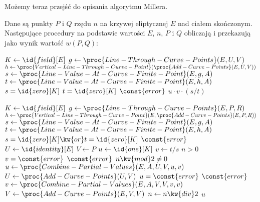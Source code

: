 \noindent
Możemy teraz przejść do opisania algorytmu Millera.

\begin{algorithm}\label{miller_alg}
Dane są punkty $P$ i $Q$ rzędu $n$
na krzywej eliptycznej $E$ nad ciałem skończonym.
Następujące procedury
na podstawie wartości $E$, $n$, $P$ i $Q$
obliczają i przekazują jako wynik
wartość $w(P, Q)$:

\begin{codebox}
\li $K \gets \id{field}[E]$
\li $g \gets \proc{Line-Through-Curve-Points}(E, U, V)$
\li $h \gets \proc{Vertical-Line-Through-Curve-Point}(\proc{Add-Curve-Points}(E, U, V))$
\li $s \gets \proc{Line-Value-At-Curve-Finite-Point}(E, g, A)$
\li $t \gets \proc{Line-Value-At-Curve-Finite-Point}(E, h, A)$
\li \If $s = \id{zero}[K]$  $t = \id{zero}[K]$
\li     \Then \Return $\const{error}$
    \End
\li \Return $u \cdot v \cdot (s / t)$
\end{codebox}

\begin{codebox}
\li $K \gets \id{field}[E]$
\li $g \gets \proc{Line-Through-Curve-Points}(E, P, R)$
\li $h \gets \proc{Vertical-Line-Through-Curve-Point}(E, \proc{Add-Curve-Points}(E, P, R))$
\li $s \gets \proc{Line-Value-At-Curve-Finite-Point}(E, g, A)$
\li $t \gets \proc{Line-Value-At-Curve-Finite-Point}(E, h, A)$
\li \If $s = \id{zero}[K] \kw{ or } t = \id{zero}[K]$
\li \Then
        \Return $\const{error}$
    \End
\li $U \gets \id{identity}[E]$
\li $V \gets P$
\li $u \gets \id{one}[K]$
\li $v \gets t / s$
\li \While $n > 0$
\li     \Do
            \If $v = \const{error}$
\li             \Then
                    \Return $\const{error}$
                \End
\li         \If $n \kw{ mod } 2 \neq 0$
\li             \Then
                    $u \gets \proc{Combine-Partial-Values}(E, A, U, V, u, v)$
\li                 $U \gets \proc{Add-Curve-Points}(U, V)$
\li                 \If $u = \const{error}$
\li                     \Then
                            \Return $\const{error}$
                        \End
                \End
\li         $v \gets \proc{Combine-Partial-Values}(E, A, V, V, v, v)$
\li         $V \gets \proc{Add-Curve-Points}(E, V, V)$
\li         $n \gets n \kw{ div } 2$
        \End
\li \Return $u$
\end{codebox}


\end{algorithm}
